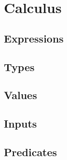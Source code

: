 

\pagebreak
\section{Calculus}
\label{sec:language}


\subsection{Expressions}



\subsection{Types}



\subsection{Values}



\subsection{Inputs}



\subsection{Predicates}

